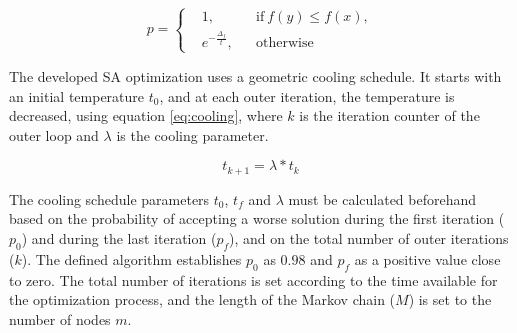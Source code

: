 \begin{equation}
\label{eq:metropolis}
  p =  \left \{
  \begin{aligned}
    & 1, && \text{if}\ f(y) \leq f(x),\\
    & e^{-\frac{\Delta_f}{t}},&& \text{otherwise}
  \end{aligned} \right. 
\end{equation}


The developed SA optimization uses a geometric cooling schedule. It starts with an initial temperature $t_0$, and at each outer iteration, the temperature is decreased, using equation \ref{eq:cooling}, where $k$ is the iteration counter of the outer loop and $\lambda$ is the cooling parameter. 

\begin{equation}
    \label{eq:cooling}
     t_{k+1} = \lambda * t_{k}
\end{equation}

The cooling schedule parameters $t_0$, $t_f$ and $\lambda$ must be calculated beforehand based on the probability of accepting a worse solution during the first iteration ($p_0$) and during the last iteration ($p_f$), and on the total number of outer iterations ($k$). The defined algorithm establishes $p_0$ as $0.98$ and $p_f$ as a positive value close to zero. The total number of iterations is set according to the time available for the optimization process, and the length of the Markov chain ($M$) is set to the number of nodes $m$.


